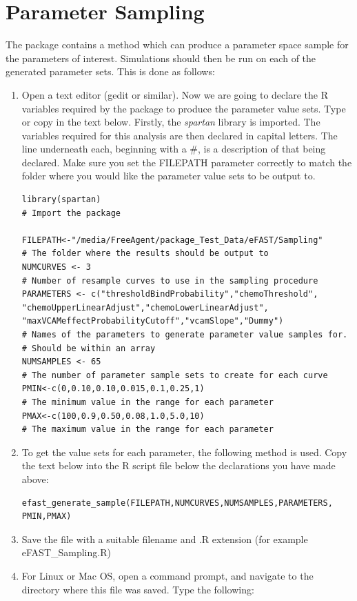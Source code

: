 \documentclass[a4paper,11pt]{article}
\begin{document}
\section{Parameter Sampling}
\noindent The package contains a method which can produce a parameter space sample for the parameters of interest. Simulations should then be run on each of the generated parameter sets.  This is done as follows:\\
\begin{enumerate}
\item Open a text editor (gedit or similar).  Now we are going to declare the R variables required by the package to produce the parameter value sets. Type or copy in the text below.  Firstly, the \textit{spartan} library is imported. The variables required for this analysis are then declared in capital letters. The line underneath each, beginning with a \#, is a description of that being declared. Make sure you set the FILEPATH parameter correctly to match the folder where you would like the parameter value sets to be output to.

\begin{verbatim}
library(spartan)
# Import the package

FILEPATH<-"/media/FreeAgent/package_Test_Data/eFAST/Sampling"
# The folder where the results should be output to
NUMCURVES <- 3
# Number of resample curves to use in the sampling procedure
PARAMETERS <- c("thresholdBindProbability","chemoThreshold",
"chemoUpperLinearAdjust","chemoLowerLinearAdjust",
"maxVCAMeffectProbabilityCutoff","vcamSlope","Dummy")
# Names of the parameters to generate parameter value samples for.
# Should be within an array
NUMSAMPLES <- 65
# The number of parameter sample sets to create for each curve
PMIN<-c(0,0.10,0.10,0.015,0.1,0.25,1) 
# The minimum value in the range for each parameter
PMAX<-c(100,0.9,0.50,0.08,1.0,5.0,10)
# The maximum value in the range for each parameter

\end{verbatim}

\item To get the value sets for each parameter, the following method is used.  Copy the text below into the R script file below the declarations you have made above:

\begin{verbatim}
efast_generate_sample(FILEPATH,NUMCURVES,NUMSAMPLES,PARAMETERS,
PMIN,PMAX)
\end{verbatim}

\item Save the file with a suitable filename and .R extension (for example eFAST\_Sampling.R)
\item For Linux or Mac OS, open a command prompt, and navigate to the directory where this file was saved.  Type the following:


\end{enumerate}
\end{document}
